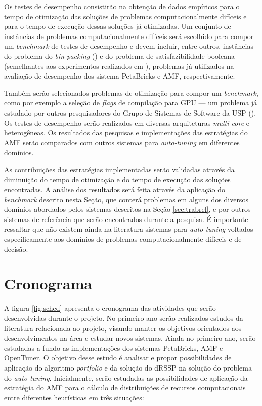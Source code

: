 \documentclass[a4paper, 12pt]{article}
\begin{document}
Os testes de desempenho consistirão na obtenção de dados empíricos para o tempo
de otimização das soluções de problemas computacionalmente difíceis e para o
tempo de execução dessas soluções já otimizadas. Um conjunto de instâncias de
problemas computacionalmente difíceis será escolhido para compor
um \emph{benchmark} de testes de desempenho e devem incluir, entre outros,
instâncias do problema do \emph{bin packing} (\citet{de1981bin}) e do problema
de satisfazibilidade booleana (semelhantes aos experimentos realizados em
\citet{goldman2011optimizing}), problemas já utilizados na avaliação de
desempenho dos sistema PetaBricks e AMF, respectivamente.

Também serão selecionados problemas de otimização para compor um
\emph{benchmark}, como por exemplo a seleção de \emph{flags} de compilação para
GPU --- um problema já estudado por outros pesquisadores do Grupo de Sistemas
de Software da USP (\citet{marcosFAPESP}). Os testes de desempenho serão
realizados em diversas arquiteturas \emph{multi-core} e heterogêneas. Os
resultados das pesquisas e implementações das estratégias do AMF serão
comparados com outros sistemas para \emph{auto-tuning} em diferentes domínios.

As contribuições das estratégias implementadas serão validadas através da
diminuição do tempo de otimização e do tempo de execução das soluções
encontradas. A análise dos resultados será feita através da aplicação do
\emph{benchmark} descrito nesta Seção, que conterá problemas em alguns dos
diversos domínios abordados pelos sistemas descritos na Seção
\ref{sec:trabrel}, e por outros sistemas de referência que serão encontrados
durante a pesquisa. É importante ressaltar que não existem ainda na literatura
sistemas para \emph{auto-tuning} voltados especificamente aos domínios de
problemas computacionalmente difíceis e de decisão.

\section{Cronograma} \label{sec:sched}

A figura \ref{fig:sched} apresenta o cronograma das atividades que serão
desenvolvidas durante o projeto.
No primeiro ano serão realizados estudos da literatura relacionada ao projeto,
visando manter os objetivos orientados aos desenvolvimentos na área e
estudar novos sistemas. Ainda no primeiro ano, serão estudadas a fundo as
implementações dos sistemas PetaBricks, AMF e OpenTuner. O objetivo desse
estudo é analisar e propor possibilidades de aplicação do algoritmo
\emph{portfolio} e da solução do dRSSP na solução do problema do
\emph{auto-tuning}. Inicialmente, serão estudadas as possibilidades de aplicação
da estratégia do AMF para o cálculo de distribuições de recursos computacionais
entre diferentes heurísticas em três situações:
\end{document}
